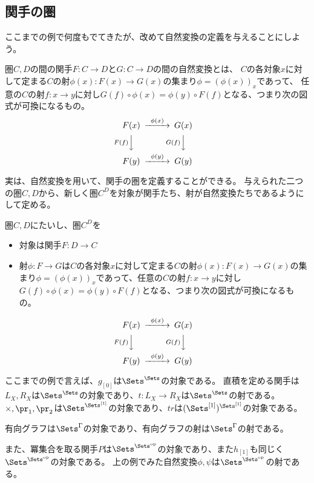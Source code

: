 \documentclass[uplatex]{jsarticle}
\begin{document}
\subsection{関手の圏}
ここまでの例で何度もでてきたが、改めて自然変換の定義を与えることにしよう。

\begin{dfn}
圏$C, D$の間の関手$F:C \to D$と$G:C \to D$の間の自然変換とは、
$C$の各対象$x$に対して定まる$C$の射$\phi(x):F(x)\to G(x)$の集まり$\phi=(\phi(x))_x$であって、
任意の$C$の射$f:x\to y$に対し$G(f)\circ\phi(x)=\phi(y)\circ F(f)$となる、つまり次の図式が可換になるもの。
\[
\begin{CD}
F(x)@>\phi(x)>>G(x)\\
@VF(f)VV@VG(f)VV\\
F(y)@>\phi(y)>>G(y)
\end{CD}
\]
\end{dfn}

実は、自然変換を用いて、関手の圏を定義することができる。
与えられた二つの圏$C, D$から、新しく圏$C^D$を対象が関手たち、射が自然変換たちであるようにして定める。
\begin{dfn}
圏$C, D$にたいし、圏$C^D$を
\begin{itemize}
\item 対象は関手$F:D\to C$
\item 射$\phi:F\to G$は$C$の各対象$x$に対して定まる$C$の射$\phi(x):F(x)\to G(x)$の集まり$\phi=(\phi(x))_x$であって、任意の$C$の射$f:x\to y$に対し$G(f)\circ\phi(x)=\phi(y)\circ F(f)$となる、つまり次の図式が可換になるもの。
\end{itemize}
\[
\begin{CD}
F(x)@>\phi(x)>>G(x)\\
@VF(f)VV@VG(f)VV\\
F(y)@>\phi(y)>>G(y)
\end{CD}
\]
\end{dfn}

ここまでの例で言えば、$g_{[0]}$は$\Sets^{\Sets}$の対象である。
直積を定める関手は$L_X, R_X$は$\Sets^{\Sets}$の対象であり、$t:L_X \to R_X$は$\Sets^{\Sets}$の射である。
$\times, \pr_1, \pr_2$は$\Sets^{\Sets^{[1]}}$の対象であり、$tr$は$(\Sets^{[1]})^{\Sets^{[1]}}$の対象である。

有向グラフは$\Sets^\Gamma$の対象であり、有向グラフの射は$\Sets^\Gamma$の射である。

また、冪集合を取る関手$P$は$\Sets^{\Sets^{\rm op}}$の対象であり、また$h_{[1]}$も同じく$\Sets^{\Sets^{\rm op}}$の対象である。
上の例でみた自然変換$\phi, \psi$は$\Sets^{\Sets^{\rm op}}$の射である。
\end{document}
